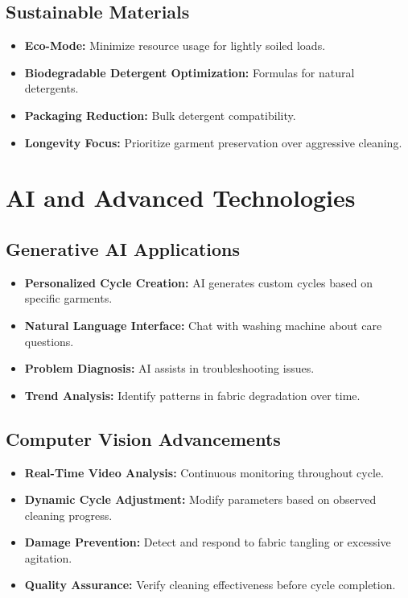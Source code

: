\subsection{Sustainable Materials}
\begin{itemize}
    \item \textbf{Eco-Mode:} Minimize resource usage for lightly soiled loads.
    \item \textbf{Biodegradable Detergent Optimization:} Formulas for natural detergents.
    \item \textbf{Packaging Reduction:} Bulk detergent compatibility.
    \item \textbf{Longevity Focus:} Prioritize garment preservation over aggressive cleaning.
\end{itemize}

\section{AI and Advanced Technologies}

\subsection{Generative AI Applications}
\begin{itemize}
    \item \textbf{Personalized Cycle Creation:} AI generates custom cycles based on specific garments.
    \item \textbf{Natural Language Interface:} Chat with washing machine about care questions.
    \item \textbf{Problem Diagnosis:} AI assists in troubleshooting issues.
    \item \textbf{Trend Analysis:} Identify patterns in fabric degradation over time.
\end{itemize}

\subsection{Computer Vision Advancements}
\begin{itemize}
    \item \textbf{Real-Time Video Analysis:} Continuous monitoring throughout cycle.
    \item \textbf{Dynamic Cycle Adjustment:} Modify parameters based on observed cleaning progress.
    \item \textbf{Damage Prevention:} Detect and respond to fabric tangling or excessive agitation.
    \item \textbf{Quality Assurance:} Verify cleaning effectiveness before cycle completion.
\end{itemize}

